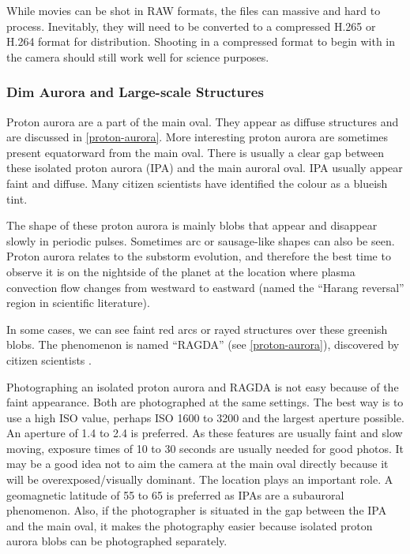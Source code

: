 \documentclass{article}
\renewcommand{\cite}[1]{\parencite{#1}}
\begin{document}
While movies can be shot in RAW formats, the files can massive and hard to process. Inevitably, they will need to be converted to a compressed H.265 or H.264 format for distribution. Shooting in a compressed format to begin with in the camera should still work well for science purposes.

\subsubsection{Dim Aurora and Large-scale Structures}\label{DimAurora}


Proton aurora are a part of the main oval. They appear as diffuse structures and are discussed in \ref{proton-aurora}. More interesting proton aurora are sometimes present equatorward from the main oval. There is usually a clear gap between these isolated proton aurora (IPA) and the main auroral oval. IPA usually appear faint and diffuse. Many citizen scientists have identified the colour as a blueish tint. 

The shape of these proton aurora is mainly blobs that appear and disappear slowly in periodic pulses. Sometimes arc or sausage-like shapes can also be seen. Proton aurora relates to the substorm evolution, and therefore the best time to observe it is on the nightside of the planet at the location where plasma convection flow changes from westward to eastward (named the ``Harang reversal'' region in scientific literature).

In some cases, we can see faint red arcs or rayed structures over these greenish blobs. The phenomenon is named ``RAGDA'' (see \ref{proton-aurora}), discovered by citizen scientists \cite{Nishimura2022}. 

Photographing an isolated proton aurora and RAGDA is not easy because of the faint appearance. Both are photographed at the same settings. The best way is to use a high ISO value, perhaps ISO 1600 to 3200 and the largest aperture possible. An aperture of 1.4 to 2.4 is preferred. As these features are usually faint and slow moving, exposure times of 10 to 30 seconds are usually needed for good photos. It may be a good idea not to aim the camera at the main oval directly because it will be overexposed/visually dominant. The location plays an important role. A geomagnetic latitude of 55 to 65 is preferred as IPAs are a subauroral phenomenon. Also, if the photographer is situated in the gap between the IPA and the main oval, it makes the photography easier because isolated proton aurora blobs can be photographed separately.
\end{document}

